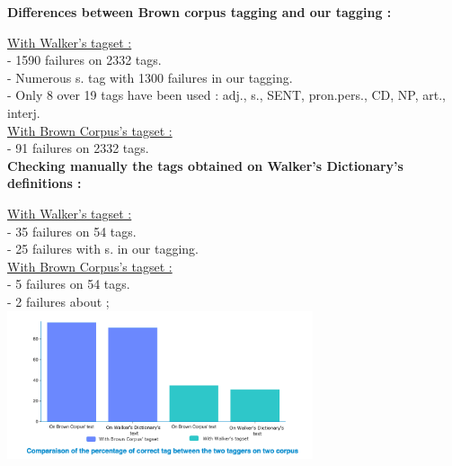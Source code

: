 \begin{center}
\large
\textbf{Differences between Brown corpus tagging and our tagging :}\\[4mm]
\normalsize

\underline{With Walker's tagset :}\\[2mm]
	- 1590 failures on 2332 tags.\\
	- Numerous s. tag with 1300 failures in our tagging.\\
	- Only 8 over 19  tags have been used  : adj., s., SENT, pron.pers., CD, NP, art., interj.\\[4mm]
\underline{With Brown Corpus's tagset :}\\[2mm]
	- 91 failures on 2332 tags.\\[4mm]

\large
\textbf{Checking manually the tags obtained on Walker's Dictionary's definitions  :}\\[2mm]
\normalsize

\underline{With Walker's tagset :}\\[2mm]
	- 35 failures on 54 tags.\\
	- 25 failures with s. in our tagging.\\[4mm]
\underline{With Brown Corpus's tagset :}\\[2mm]
	- 5 failures on 54 tags.\\
	- 2 failures about ;\\[2mm]
	
		\includegraphics[width=9cm]{chart3.png}

\end{center}
